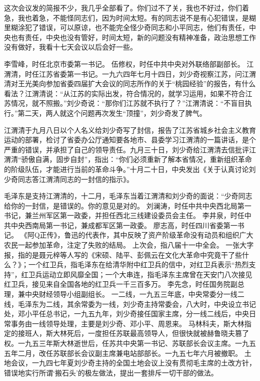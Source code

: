 这次会议发的简报不少，我几乎全部看了。你们过不了关，我也不好过，你们着急，我也着急，不能怪同志们，因为时间太短。有的同志说不是有心犯错误，是糊里糊涂犯了错误，可以原谅，也不能完全怪少奇同志和小平同志，他们有责任，中央也有责任，中央也没有管好，时间太短，新的问题没有精神准备，政治思想工作没有做好，我看十七天会议以后会好一些。

\begin{maonote}
李雪峰，时任北京市委第一书记。
伍修权，时任中共中央对外联络部副部长。
江渭清，时任江苏省委第一书记。一九六四年七月十四日，刘少奇视察江苏，问江渭清对王光美向参加省委四届扩大会议的同志所作的关于“桃园经验”的报告，有什么看法？江渭清说：“从江苏的实际出发，符合情况的，就学习运用，如果不符合江苏情况，就不照搬。”刘少奇说：“那你们江苏就不执行了？”江渭清说：“不盲目执行。”第二天，两人就这个问题再次发生“顶撞”，刘少奇发了脾气。

江渭清于九月八日以个人名义给刘少奇写了封信，报告了江苏省城乡社会主义教育运动的部署，检讨了省委办公厅通知要各地市、县委学习江渭清的一篇讲话，是个严重的错误，并承担了自己的领导责任。九月三十日，刘少奇给江渭清去信批评江渭清“骄傲自满，固步自封”，指出：“你们必须重新了解本省情况，重新组织革命的阶级队伍，才能进行当前的革命斗争。”十月二十日，中央发出《关于认真讨论刘少奇同志答江渭清同志的一封信的指示》。

毛泽东是支持江渭清的，十二月，毛泽东当着江渭清和刘少奇的面说：“少奇同志给你的一封信，是错误的。你的意见是对的。
刘澜涛，时任中共中央西北局第一书记，兼兰州军区第一政委，并担任西北三线建设委员会主任。
李井泉，时任中共中央西南局第一书记，兼成都军区第一政委。
廖志高，时任四川省委第一书记。
《阿Q正传》，鲁迅的代表作，其中反映了资产阶级革命没有动员和组织广大农民一起参加革命，注定了失败的结局。
上次会，指八届十一中全会。
一张大字报，指的是聂元梓等人写的《宋硕、陆平、彭佩云在文化大革命中究竟干了些什么？》；一个红卫兵，指毛泽东在给清华附中红卫兵的信中，对红卫兵表示“热烈支持”，红卫兵运动立即风靡全国；一个大串连，指毛泽东主席曾在天安门八次接见红卫兵，接见来自全国各地的红卫兵一千三百多万。
李先念，时任国务院副总理，兼中央财经领导小组副组长。
一二线，一九五三年底，中央常委分一线二线，毛泽东为二线，其余常委为一线，刘少奇主持常委会，八大时，中央设立书记处，邓小平任总书记，一九五九年，刘少奇接任国家主席，分一线二线后，中央日常事务由一线领导处理，主要是刘少奇、邓小平、周恩来。
马林科夫，斯大林指定的接班人，斯大林死后，一度担任苏联最高领导人，但很快就被赫鲁晓夫篡了权。一九五三年斯大林逝世后，任苏共中央第一书记、苏联部长会议主席。一九五五年二月，改任苏联部长会议副主席兼电站部部长。一九五七年六月被撤职。
土地会议，一九四七年夏刘少奇主持的全国土地会议上没有贯彻毛主席的土改方针，错误地实行所谓‘搬石头’的极左做法，提出一套排斥一切干部的做法。


\end{maonote}

